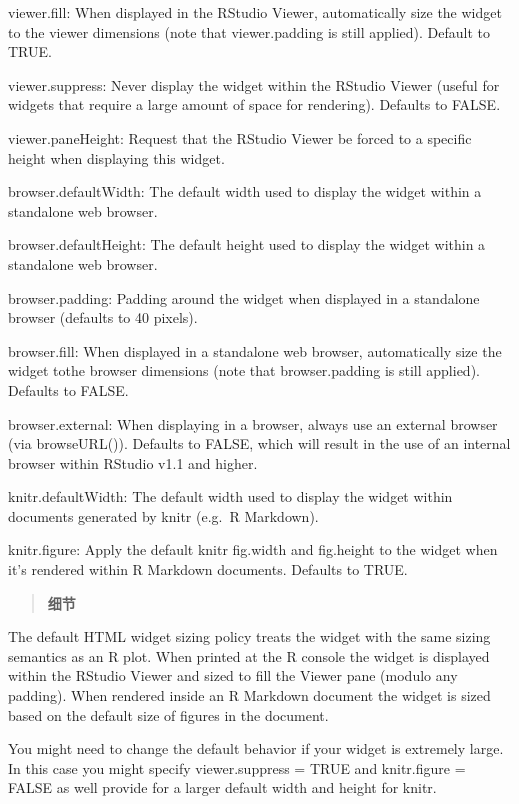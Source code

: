 \documentclass[]{book}
\theoremstyle{definition}
\theoremstyle{definition}
\theoremstyle{definition}
\theoremstyle{remark}
\begin{document}
viewer.fill: When displayed in the RStudio Viewer, automatically size
the widget to the viewer dimensions (note that viewer.padding is still
applied). Default to TRUE.

viewer.suppress: Never display the widget within the RStudio Viewer
(useful for widgets that require a large amount of space for rendering).
Defaults to FALSE.

viewer.paneHeight: Request that the RStudio Viewer be forced to a
specific height when displaying this widget.

browser.defaultWidth: The default width used to display the widget
within a standalone web browser.

browser.defaultHeight: The default height used to display the widget
within a standalone web browser.

browser.padding: Padding around the widget when displayed in a
standalone browser (defaults to 40 pixels).

browser.fill: When displayed in a standalone web browser, automatically
size the widget tothe browser dimensions (note that browser.padding is
still applied). Defaults to FALSE.

browser.external: When displaying in a browser, always use an external
browser (via browseURL()). Defaults to FALSE, which will result in the
use of an internal browser within RStudio v1.1 and higher.

knitr.defaultWidth: The default width used to display the widget within
documents generated by knitr (e.g.~R Markdown).

knitr.figure: Apply the default knitr fig.width and fig.height to the
widget when it's rendered within R Markdown documents. Defaults to TRUE.

\begin{quote}
\textbf{细节}
\end{quote}

The default HTML widget sizing policy treats the widget with the same
sizing semantics as an R plot. When printed at the R console the widget
is displayed within the RStudio Viewer and sized to fill the Viewer pane
(modulo any padding). When rendered inside an R Markdown document the
widget is sized based on the default size of figures in the document.

You might need to change the default behavior if your widget is
extremely large. In this case you might specify viewer.suppress = TRUE
and knitr.figure = FALSE as well provide for a larger default width and
height for knitr.
\end{document}
